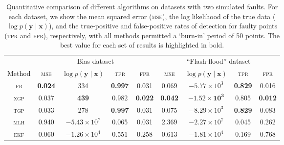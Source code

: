 \documentclass{article}
\newcommand{\psff}[1]{\texttt{[image: \#1.eps]}}
\newcommand{\given}{\ensuremath{\mid}}
\newcommand{\bm}[1]{\ensuremath{\mathbf{#1}}}
\begin{document}

\begin{table}
  \begin{center}
  \caption{Quantitative comparison of different algorithms on datasets with two simulated faults.  For each dataset, we show the mean squared error
    (\textsc{mse}), the log likelihood of the true data ($\log p(\bm{y}
    \given \bm{x})$), and the true-positive and false-positive rates
    of detection for faulty points (\textsc{tpr} and \textsc{fpr}),
    respectively, with all methods permitted a `burn-in' period of 50 points. The best value for each set of results is highlighted in
    bold.}
    \vspace{2mm}
  \label{tbl:results}
  \begin{tabular}{ccccccccc}
    \toprule
& \multicolumn{4}{c}{Bias dataset} & \multicolumn{4}{c}{``Flash-flood'' dataset}\\
    \cmidrule(l){2-5} \cmidrule(l){6-9}
    Method & \scshape{mse} & $\log p(\bm{y}\given\bm{x})$ & \scshape{tpr} & \scshape{fpr} 
& \scshape{mse} & $\log p(\bm{y}\given\bm{x})$ & \scshape{tpr} & \scshape{fpr} \\
\midrule
    \scshape{fb} & \textbf{0.024} & 334 & \textbf{0.997} & 0.031 & 0.069 & $-5.77\times 10^3$ & \textbf{0.829} & {0.016} \\
    \scshape{xgp} & 0.037 & \textbf{439} & 0.982 & \textbf{0.022} & \textbf{0.042} & $\mathbf{-1.52 \times 10^3}$ & 0.805 & \textbf{0.012} \\
    \scshape{tgp} & 0.033 & 278 & \textbf{0.997} & 0.031 & 0.075 & $-8.29\times 10^3$ & \textbf{0.829} & 0.083 \\
    \scshape{mlh} & 0.940 & $-5.43\times 10^7$ & 0.065 & 0.031 & 2.369 & $-2.27\times 10^7$ & 0.045 & 0.262 \\
   \scshape{ekf} & 0.060 & $-1.26 \times 10^4$ & 0.551 & 0.258 & 0.613 & $-1.81\times 10^4$ & 0.169 & 0.768 \\
    \bottomrule
  \end{tabular}
  \end{center}
\end{table}
\end{document}
